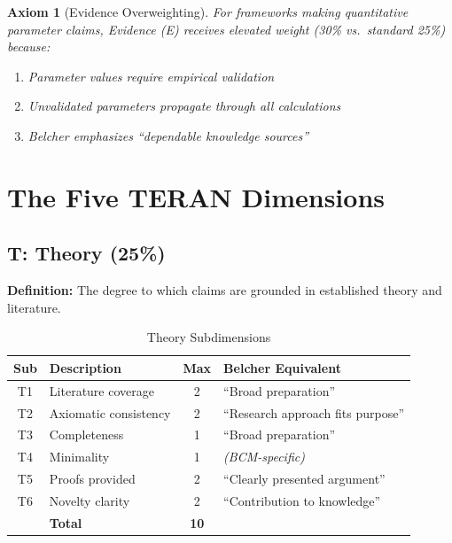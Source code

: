 \documentclass[11pt,a4paper]{article}
\newtheorem{axiom}{Axiom}[section]
\begin{document}
\begin{axiom}[Evidence Overweighting]
\label{ax:evidence}
For frameworks making quantitative parameter claims, Evidence (E) receives elevated weight (30\% vs.\ standard 25\%) because:
\begin{enumerate}
    \item Parameter values require empirical validation
    \item Unvalidated parameters propagate through all calculations
    \item Belcher emphasizes ``dependable knowledge sources''
\end{enumerate}
\end{axiom}


\section{The Five TERAN Dimensions}
\label{sec:dimensions}

\subsection{T: Theory (25\%)}

\textbf{Definition:} The degree to which claims are grounded in established theory and literature.

\begin{table}[h]
\centering
\caption{Theory Subdimensions}
\begin{tabular}{clcp{6cm}}
\toprule
\textbf{Sub} & \textbf{Description} & \textbf{Max} & \textbf{Belcher Equivalent} \\
\midrule
T1 & Literature coverage & 2 & ``Broad preparation'' \\
T2 & Axiomatic consistency & 2 & ``Research approach fits purpose'' \\
T3 & Completeness & 1 & ``Broad preparation'' \\
T4 & Minimality & 1 & \textit{(BCM-specific)} \\
T5 & Proofs provided & 2 & ``Clearly presented argument'' \\
T6 & Novelty clarity & 2 & ``Contribution to knowledge'' \\
\midrule
& \textbf{Total} & \textbf{10} & \\
\bottomrule
\end{tabular}
\end{table}
\end{document}
